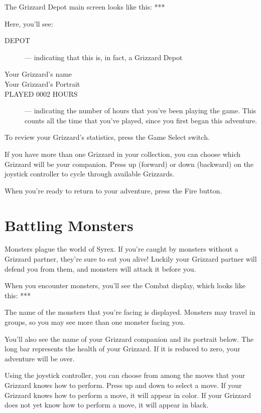 \documentclass[12pt,twoside,openright,book]{memoir}
\begin{document}
The Grizzard Depot main screen looks like this: ***

Here, you'll see:

\begin{description}
  
\item[DEPOT] --- indicating that this is, in fact, a Grizzard Depot
\item[Your Grizzard's name] 
\item[Your Grizzard's Portrait] 
\item[PLAYED 0002 HOURS] --- indicating  the number of hours that you've
  been playing  the game. This counts  all the time that  you've played,
  since you  first began this  adventure.

\end{description}

To review your Grizzard's statistics, press the Game Select switch.

\ifdef\DEMO\else
If you  have more than one  Grizzard in your collection,  you can choose
which  Grizzard will  be  your  companion. Press  up  (forward) or  down
(backward)  on  the  joystick  controller  to  cycle  through  available
Grizzards.
\fi

When you're ready to return to your adventure, press the Fire button.


\section{Battling Monsters}

Monsters plague the world of Syrex. If you're caught by monsters without
a Grizzard partner, they're sure to eat you alive! Luckily your Grizzard
partner  will  defend  you  from  them,  and  monsters  will  attack  it
before you.

When you encounter monsters, you'll  see the Combat display, which looks
like this: ***

The name of  the monsters that you're facing is  displayed. Monsters may
travel in groups, so you may see more than one monster facing you.

You'll also  see the name  of your  Grizzard companion and  its portrait
below. The  long bar represents  the health of  your Grizzard. If  it is
reduced to zero, your adventure will be over.

Using the joystick controller, you can  choose from among the moves that
your Grizzard knows how to perform. Press  up and down to select a move.
If your Grizzard knows  how to perform a move, it  will appear in color.
If your Grizzard does not yet know how to perform a move, it will appear
in black.
\end{document}
